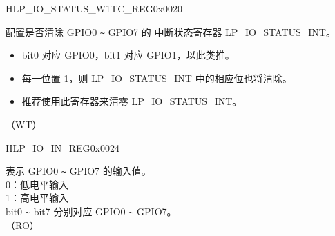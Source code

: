 \begin{register}{H}{LP\_IO\_STATUS\_W1TC\_REG}{0x0020}\label{regdesc:LPIOSTATUSW1TCREG}
%
%
\regnewline%
\begin{regdesc}\begin{reglist}
\label{fielddesc:LPIOSTATUSINTW1TC}\item [LP\_GPIO\_STATUS\_INT\_W1TC] 配置是否清除 GPIO0 \verb+~+ GPIO7 的 中断状态寄存器 \hyperref[fielddesc:LPIOSTATUSINT]{LP\_IO\_STATUS\_INT}。\\
\begin{itemize}
    \item bit0 对应 GPIO0，bit1 对应 GPIO1，以此类推。
    \item 每一位置 1，则 \hyperref[fielddesc:LPIOSTATUSINT]{LP\_IO\_STATUS\_INT} 中的相应位也将清除。
    \item 推荐使用此寄存器来清零 \hyperref[fielddesc:LPIOSTATUSINT]{LP\_IO\_STATUS\_INT}。\end{itemize}（WT）
\end{reglist}\end{regdesc}
\end{register}


\begin{register}{H}{LP\_IO\_IN\_REG}{0x0024}\label{regdesc:LPIOINREG}
%
%
\regnewline%
\begin{regdesc}\begin{reglist}
\label{fielddesc:LPIOINNEXT}\item [LP\_GPIO\_IN\_NEXT] 表示 GPIO0 \verb+~+ GPIO7 的输入值。\\
0：低电平输入\\
1：高电平输入\\
bit0 \verb+~+ bit7 分别对应 GPIO0 \verb+~+ GPIO7。\\（RO）
\end{reglist}\end{regdesc}
\end{register}


